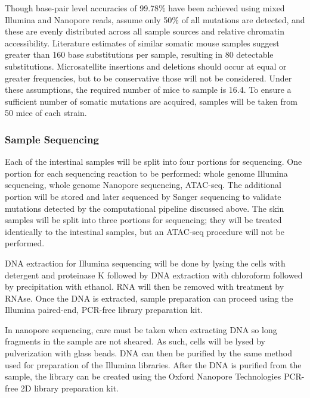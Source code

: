 Though base-pair level accuracies of 99.78\% have been achieved using mixed Illumina and Nanopore reads, assume only 50\% of all mutations are detected, and these are evenly distributed across all sample sources and relative chromatin accessibility. Literature estimates \parencite{behjati_genome_2014} of similar somatic mouse samples suggest greater than 160 base substitutions per sample, resulting in 80 detectable substitutions. Microsatellite insertions and deletions should occur at equal or greater frequencies, but to be conservative those will not be considered. Under these assumptions, the required number of mice to sample is 16.4. To ensure a sufficient number of somatic mutations are acquired, samples will be taken from 50 mice of each strain.


\subsubsection{Sample Sequencing}

Each of the intestinal samples will be split into four portions for sequencing. One portion for each sequencing reaction to be performed: whole genome Illumina sequencing, whole genome Nanopore sequencing, ATAC-seq. The additional portion will be stored and later sequenced by Sanger sequencing to validate mutations detected by the computational pipeline discussed above. The skin samples will be split into three portions for sequencing; they will be treated identically to the intestinal samples, but an ATAC-seq procedure will not be performed.

DNA extraction for Illumina sequencing will be done by lysing the cells with detergent and proteinase K followed by DNA extraction with chloroform followed by precipitation with ethanol. RNA will then be removed with treatment by RNAse. Once the DNA is extracted, sample preparation can proceed using the Illumina paired-end, PCR-free library preparation kit.

In nanopore sequencing, care must be taken when extracting DNA so long fragments in the sample are not sheared. As such, cells will be lysed by pulverization with glass beads. DNA can then be purified by the same method used for preparation of the Illumina libraries. After the DNA is purified from the sample, the library can be created using the Oxford Nanopore Technologies PCR-free 2D library preparation kit. 

